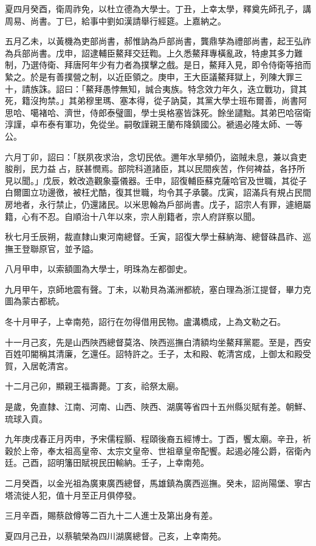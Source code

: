 \begin{pinyinscope}
夏四月癸酉，衛周祚免，以杜立德為大學士。丁丑，上幸太學，釋奠先師孔子，講周易、尚書。丁巳，給事中劉如漢請舉行經筵。上嘉納之。

五月乙未，以黃機為吏部尚書，郝惟訥為戶部尚書，龔鼎孳為禮部尚書，起王弘祚為兵部尚書。戊申，詔逮輔臣鰲拜交廷鞫。上久悉鰲拜專橫亂政，特慮其多力難制，乃選侍衛、拜唐阿年少有力者為撲擊之戲。是日，鰲拜入見，即令侍衛等掊而縶之。於是有善撲營之制，以近臣領之。庚申，王大臣議鰲拜獄上，列陳大罪三十，請族誅。詔曰：「鰲拜愚悖無知，誠合夷族。特念效力年久，迭立戰功，貸其死，籍沒拘禁。」其弟穆里瑪、塞本得，從子訥莫，其黨大學士班布爾善，尚書阿思哈、噶褚哈、濟世，侍郎泰璧圖，學士吳格塞皆誅死。餘坐譴黜。其弟巴哈宿衛淳謹，卓布泰有軍功，免從坐。嗣敬謹親王蘭布降鎮國公。褫遏必隆太師、一等公。

六月丁卯，詔曰：「朕夙夜求治，念切民依。邇年水旱頻仍，盜賊未息，兼以貪吏朘削，民力益占，朕甚憫焉。部院科道諸臣，其以民間疾苦，作何裨益，各抒所見以聞。」戊辰，敕改造觀象臺儀器。壬申，詔復輔臣蘇克薩哈官及世職，其從子白爾圖立功邊徼，被枉尤酷，復其世職，均令其子承襲。戊寅，詔滿兵有規占民間房地者，永行禁止，仍還諸民。以米思翰為戶部尚書。戊子，詔宗人有罪，遽絕屬籍，心有不忍。自順治十八年以來，宗人削籍者，宗人府詳察以聞。

秋七月壬辰朔，裁直隸山東河南總督。壬寅，詔復大學士蘇納海、總督硃昌祚、巡撫王登聯原官，並予謚。

八月甲申，以索額圖為大學士，明珠為左都御史。

九月甲午，京師地震有聲。丁未，以勒貝為滿洲都統，塞白理為浙江提督，畢力克圖為蒙古都統。

冬十月甲子，上幸南苑，詔行在勿得借用民物。盧溝橋成，上為文勒之石。

十一月己亥，先是山西陜西總督莫洛、陜西巡撫白清額均坐鰲拜黨罷。至是，西安百姓叩閽稱其清廉，乞還任。詔特許之。壬子，太和殿、乾清宮成，上御太和殿受賀，入居乾清宮。

十二月己卯，顯親王福壽薨。丁亥，祫祭太廟。

是歲，免直隸、江南、河南、山西、陜西、湖廣等省四十五州縣災賦有差。朝鮮、琉球入貢。

九年庚戌春正月丙申，予宋儒程顥、程頤後裔五經博士。丁酉，饗太廟。辛丑，祈穀於上帝，奉太祖高皇帝、太宗文皇帝、世祖章皇帝配饗。起遏必隆公爵，宿衛內廷。己酉，詔明籓田賦視民田輸納。壬子，上幸南苑。

二月癸酉，以金光祖為廣東廣西總督，馬雄鎮為廣西巡撫。癸未，詔尚陽堡、寧古塔流徙人犯，值十月至正月俱停發。

三月辛酉，賜蔡啟僔等二百九十二人進士及第出身有差。

夏四月己丑，以蔡毓榮為四川湖廣總督。己亥，上幸南苑。


\end{pinyinscope}
